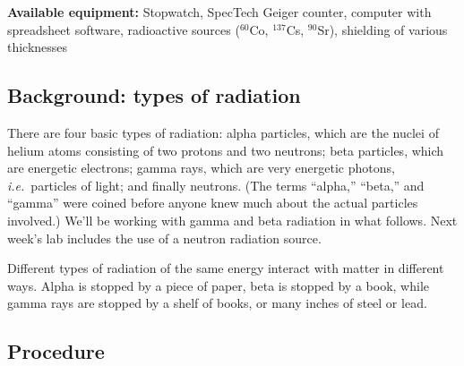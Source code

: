 \textbf{Available equipment:} Stopwatch, SpecTech Geiger counter, computer with spreadsheet software, radioactive sources ($^{60}$Co, $^{137}$Cs, $^{90}$Sr), shielding of various thicknesses

\subsection{Background: types of radiation}

There are four basic types of radiation: alpha particles, which are the nuclei of helium
atoms consisting of two protons and two neutrons; beta particles, which are energetic
electrons; gamma rays, which are very energetic photons, \textit{i.e.}\ particles of light; and
finally neutrons. (The terms ``alpha,'' ``beta,'' and ``gamma'' were coined before anyone
knew much about the actual particles involved.) We’ll be working with gamma and beta
radiation in what follows. Next week's lab includes the use of a neutron
radiation source.

Different types of radiation of the same energy interact with matter in different ways.
Alpha is stopped by a piece of paper, beta is stopped by a book, while gamma rays are stopped by a shelf of books, or many inches of steel or lead.

\subsection{Procedure}

